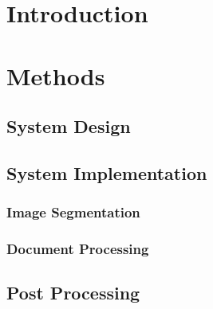 \documentclass[10pt, conference, compsocconf]{IEEEtran}
\begin{document}
	\IEEEpeerreviewmaketitle
	
	\section{Introduction}
	





	
	\section{Methods}
		\subsection{System Design}



		\subsection{System Implementation}



			\subsubsection{Image Segmentation}


			


			\subsubsection{Document Processing}



		\subsection{Post Processing}
\end{document}
